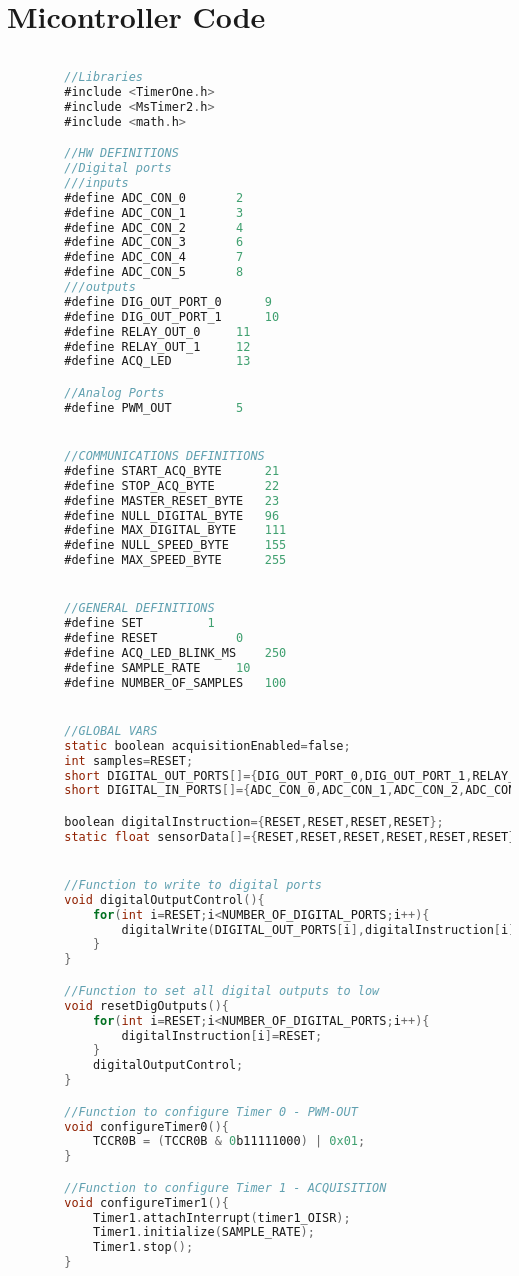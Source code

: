\section{Micontroller Code}

	\begin{lstlisting}[language=C]
	
		//Libraries
		#include <TimerOne.h>
		#include <MsTimer2.h>
		#include <math.h>

		//HW DEFINITIONS
		//Digital ports
		///inputs
		#define	ADC_CON_0		2
		#define	ADC_CON_1		3
		#define	ADC_CON_2		4
		#define	ADC_CON_3		6
		#define	ADC_CON_4		7
		#define	ADC_CON_5		8
		///outputs
		#define DIG_OUT_PORT_0		9
		#define	DIG_OUT_PORT_1		10
		#define RELAY_OUT_0		11
		#define RELAY_OUT_1		12
		#define	ACQ_LED			13

		//Analog Ports
		#define	PWM_OUT			5


		//COMMUNICATIONS DEFINITIONS
		#define START_ACQ_BYTE		21
		#define	STOP_ACQ_BYTE		22
		#define MASTER_RESET_BYTE	23
		#define NULL_DIGITAL_BYTE	96
		#define MAX_DIGITAL_BYTE	111
		#define NULL_SPEED_BYTE		155
		#define MAX_SPEED_BYTE		255


		//GENERAL DEFINITIONS
		#define SET			1
		#define RESET			0
		#define ACQ_LED_BLINK_MS	250
		#define SAMPLE_RATE		10
		#define NUMBER_OF_SAMPLES	100


		//GLOBAL VARS
		static boolean acquisitionEnabled=false;
		int samples=RESET;
		short DIGITAL_OUT_PORTS[]={DIG_OUT_PORT_0,DIG_OUT_PORT_1,RELAY_OUT_0,RELAY_OUT_1};
		short DIGITAL_IN_PORTS[]={ADC_CON_0,ADC_CON_1,ADC_CON_2,ADC_CON_3,ADC_CON_4,ADC_CON_5};

		boolean digitalInstruction={RESET,RESET,RESET,RESET};
		static float sensorData[]={RESET,RESET,RESET,RESET,RESET,RESET};


		//Function to write to digital ports
		void digitalOutputControl(){
			for(int i=RESET;i<NUMBER_OF_DIGITAL_PORTS;i++){
				digitalWrite(DIGITAL_OUT_PORTS[i],digitalInstruction[i])
			}
		}

		//Function to set all digital outputs to low
		void resetDigOutputs(){
			for(int i=RESET;i<NUMBER_OF_DIGITAL_PORTS;i++){
				digitalInstruction[i]=RESET;
			}
			digitalOutputControl;
		}

		//Function to configure Timer 0 - PWM-OUT
		void configureTimer0(){
			TCCR0B = (TCCR0B & 0b11111000) | 0x01;
		}

		//Function to configure Timer 1 - ACQUISITION 
		void configureTimer1(){
			Timer1.attachInterrupt(timer1_OISR);
			Timer1.initialize(SAMPLE_RATE);
			Timer1.stop();
		}


\end{lstlisting}
